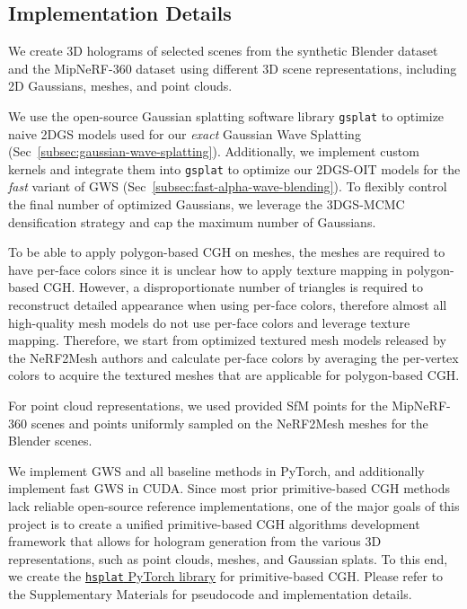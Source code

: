 


\subsection{Implementation Details}
We create 3D holograms of selected scenes from the synthetic Blender dataset \cite{mildenhall2020nerf} and the MipNeRF-360 dataset \cite{barron2022mipnerf360} using different 3D scene representations, including 2D Gaussians, meshes, and point clouds.

We use the open-source Gaussian splatting software library \texttt{gsplat} \cite{ye2024gsplat} to optimize naive 2DGS models used for our \textit{exact} Gaussian Wave Splatting (Sec~\ref{subsec:gaussian-wave-splatting}). Additionally, we implement custom kernels and integrate them into \texttt{gsplat} to optimize our 2DGS-OIT models for the \textit{fast} variant of GWS (Sec~\ref{subsec:fast-alpha-wave-blending}). To flexibly control the final number of optimized Gaussians, we leverage the 3DGS-MCMC densification strategy \cite{kheradmand20243dgsmcmc} and cap the maximum number of Gaussians.

To be able to apply polygon-based CGH on meshes, the meshes are required to have per-face colors since it is unclear how to apply texture mapping in polygon-based CGH.  However, a disproportionate number of triangles is required to reconstruct detailed appearance when using per-face colors, therefore almost all high-quality mesh models do not use per-face colors and leverage texture mapping. Therefore, we start from optimized textured mesh models released by the NeRF2Mesh \cite{tang2022nerf2mesh} authors and calculate per-face colors by averaging the per-vertex colors to acquire the textured meshes that are applicable for polygon-based CGH. 

For point cloud representations, we used provided SfM points for the MipNeRF-360 scenes and points uniformly sampled on the NeRF2Mesh meshes for the Blender scenes.

 We implement GWS and all baseline methods in PyTorch, and additionally implement fast GWS in CUDA. Since most prior primitive-based CGH methods lack reliable open-source reference implementations, one of the major goals of this project is to create a unified primitive-based CGH algorithms development framework that allows for hologram generation from the various 3D representations, such as point clouds, meshes, and Gaussian splats. To this end, we create the \href{https://github.com/computational-imaging/hsplat}{\texttt{hsplat} PyTorch library} for primitive-based CGH. Please refer to the Supplementary Materials for pseudocode and implementation details.


